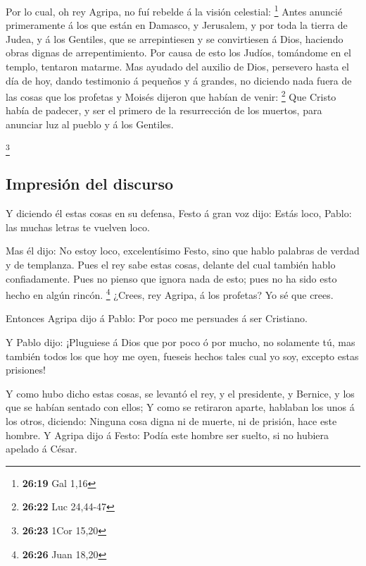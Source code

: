  Por lo cual, oh rey Agripa, no fuí rebelde á la visión
celestial: \footnote{\textbf{26:19} Gal 1,16}  Antes
anuncié primeramente á los que están en Damasco, y Jerusalem, y por toda
la tierra de Judea, y á los Gentiles, que se arrepintiesen y se
convirtiesen á Dios, haciendo obras dignas de arrepentimiento.
 Por causa de esto los Judíos, tomándome en el templo,
tentaron matarme.  Mas ayudado del auxilio de Dios,
persevero hasta el día de hoy, dando testimonio á pequeños y á grandes,
no diciendo nada fuera de las cosas que los profetas y Moisés dijeron
que habían de venir: \footnote{\textbf{26:22} Luc 24,44-47}
 Que Cristo había de padecer, y ser el primero de la
resurrección de los muertos, para anunciar luz al pueblo y á los
Gentiles.

\footnote{\textbf{26:23} 1Cor 15,20}

\hypertarget{impresiuxf3n-del-discurso}{%
\subsection{Impresión del discurso}\label{impresiuxf3n-del-discurso}}

 Y diciendo él estas cosas en su defensa, Festo á gran voz
dijo: Estás loco, Pablo: las muchas letras te vuelven loco.

 Mas él dijo: No estoy loco, excelentísimo Festo, sino que
hablo palabras de verdad y de templanza.  Pues el rey sabe
estas cosas, delante del cual también hablo confiadamente. Pues no
pienso que ignora nada de esto; pues no ha sido esto hecho en algún
rincón. \footnote{\textbf{26:26} Juan 18,20}  ¿Crees, rey
Agripa, á los profetas? Yo sé que crees.

 Entonces Agripa dijo á Pablo: Por poco me persuades á ser
Cristiano.

 Y Pablo dijo: ¡Pluguiese á Dios que por poco ó por mucho,
no solamente tú, mas también todos los que hoy me oyen, fueseis hechos
tales cual yo soy, excepto estas prisiones!

 Y como hubo dicho estas cosas, se levantó el rey, y el
presidente, y Bernice, y los que se habían sentado con ellos;
 Y como se retiraron aparte, hablaban los unos á los otros,
diciendo: Ninguna cosa digna ni de muerte, ni de prisión, hace este
hombre.  Y Agripa dijo á Festo: Podía este hombre ser
suelto, si no hubiera apelado á César.

